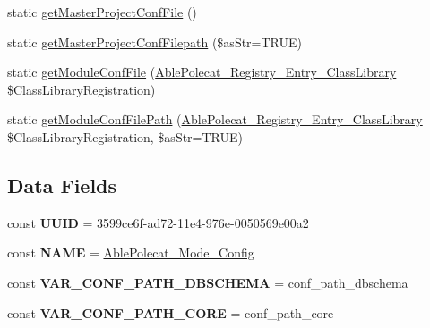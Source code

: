 \begin{DoxyCompactItemize}
static \hyperlink{class_able_polecat___mode___config_a115ac4346504ae0611ae1a31b3c04aa9}{get\+Master\+Project\+Conf\+File} ()
\item 
static \hyperlink{class_able_polecat___mode___config_a37318e85fb6ad1deaa8e946b4fd600f9}{get\+Master\+Project\+Conf\+Filepath} (\$as\+Str=T\+R\+U\+E)
\item 
static \hyperlink{class_able_polecat___mode___config_a7feaf8557552f12d5e32eb4cf59cee56}{get\+Module\+Conf\+File} (\hyperlink{class_able_polecat___registry___entry___class_library}{Able\+Polecat\+\_\+\+Registry\+\_\+\+Entry\+\_\+\+Class\+Library} \$Class\+Library\+Registration)
\item 
static \hyperlink{class_able_polecat___mode___config_a1f15f64da7e2d81379ced14727f5f52a}{get\+Module\+Conf\+File\+Path} (\hyperlink{class_able_polecat___registry___entry___class_library}{Able\+Polecat\+\_\+\+Registry\+\_\+\+Entry\+\_\+\+Class\+Library} \$Class\+Library\+Registration, \$as\+Str=T\+R\+U\+E)
\end{DoxyCompactItemize}
\subsection*{Data Fields}
\begin{DoxyCompactItemize}
\item 
\hypertarget{class_able_polecat___mode___config_a74b892c8c0b86bf9d04c5819898c51e7}{}const {\bfseries U\+U\+I\+D} = \textquotesingle{}3599ce6f-\/ad72-\/11e4-\/976e-\/0050569e00a2\textquotesingle{}\label{class_able_polecat___mode___config_a74b892c8c0b86bf9d04c5819898c51e7}

\item 
\hypertarget{class_able_polecat___mode___config_a244352f035b82b20b0efa506167fd862}{}const {\bfseries N\+A\+M\+E} = \textquotesingle{}\hyperlink{class_able_polecat___mode___config}{Able\+Polecat\+\_\+\+Mode\+\_\+\+Config}\textquotesingle{}\label{class_able_polecat___mode___config_a244352f035b82b20b0efa506167fd862}

\item 
\hypertarget{class_able_polecat___mode___config_aa86f4209b3df743489a5ce15779f72bc}{}const {\bfseries V\+A\+R\+\_\+\+C\+O\+N\+F\+\_\+\+P\+A\+T\+H\+\_\+\+D\+B\+S\+C\+H\+E\+M\+A} = \textquotesingle{}conf\+\_\+path\+\_\+dbschema\textquotesingle{}\label{class_able_polecat___mode___config_aa86f4209b3df743489a5ce15779f72bc}

\item 
\hypertarget{class_able_polecat___mode___config_addb454daba30e451ab36fb5b6c9a86c0}{}const {\bfseries V\+A\+R\+\_\+\+C\+O\+N\+F\+\_\+\+P\+A\+T\+H\+\_\+\+C\+O\+R\+E} = \textquotesingle{}conf\+\_\+path\+\_\+core\textquotesingle{}\label{class_able_polecat___mode___config_addb454daba30e451ab36fb5b6c9a86c0}

\end{DoxyCompactItemize}
